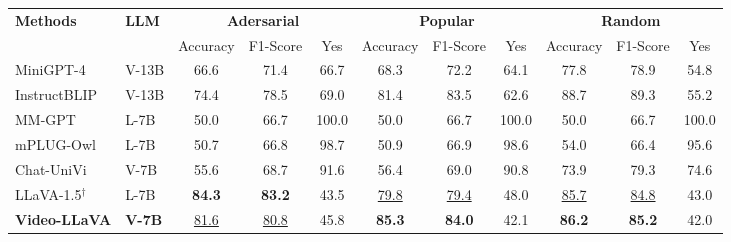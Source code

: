 \begin{table*}[t]
  \setlength\tabcolsep{0.65mm}
  \caption{\textbf{Zero-shot object hallucination evaluation results} are reported for three POPE evaluation settings. ``Yes'' indicates the proportion of positive responses to the given question. $^\dag$ donates that we reproduce LLaVA-1.5 with LanguageBind-Image encoder to compare fairly.}
  \label{tab:pope}
  \centering
  \begin{tabular}{ll|ccc|ccc|ccc}
    \toprule
    \multirow{2}{*}{\textbf{Methods}} & \multirow{2}{*}{\textbf{LLM}}& \multicolumn{3}{c|}{\textbf{Adersarial}} & \multicolumn{3}{c|}{\textbf{Popular}}  & \multicolumn{3}{c}{\textbf{Random}}  \\
     &  & Accuracy & F1-Score & Yes & Accuracy & F1-Score & Yes & Accuracy & F1-Score & Yes \\
    \midrule
    \rowcolor{mygray} \color{gray} MiniGPT-4 & \color{gray} V-13B & \color{gray} 66.6 & \color{gray} 71.4 & \color{gray} 66.7 & \color{gray} 68.3 & \color{gray} 72.2 & \color{gray} 64.1 & \color{gray} 77.8 & \color{gray} 78.9 & \color{gray} 54.8 \\
    \rowcolor{mygray} \color{gray} InstructBLIP & \color{gray} V-13B & \color{gray} {74.4} & \color{gray} {78.5} & \color{gray} 69.0 & \color{gray} {81.4} & \color{gray} {83.5} & \color{gray} 62.6 & \color{gray} {88.7} & \color{gray} {89.3} & \color{gray} 55.2 \\
    MM-GPT & L-7B & 50.0 & 66.7 & 100.0 & 50.0 & 66.7 & 100.0 & 50.0 & 66.7 & 100.0 \\
    mPLUG-Owl & L-7B & 50.7 & 66.8 & 98.7 & 50.9 & 66.9 & 98.6 & 54.0 & 66.4 & 95.6 \\
    Chat-UniVi & V-7B & {55.6} & {68.7} & 91.6 & {56.4} & {69.0} & 90.8 & {73.9} & {79.3} & 74.6 \\
    LLaVA-1.5$^\dag$ & L-7B & \textbf{84.3} & \textbf{83.2} & 43.5 & \underline{79.8} & \underline{79.4} & 48.0 & \underline{85.7} & \underline{84.8} & 43.0 \\
    \rowcolor{blue} \textbf{Video-LLaVA} & \textbf{V-7B} & \underline{81.6} & \underline{80.8} & 45.8 & \textbf{85.3} & \textbf{84.0} & 42.1 & \textbf{86.2} & \textbf{85.2} & 42.0 \\
    \bottomrule
  \end{tabular}
\end{table*}


